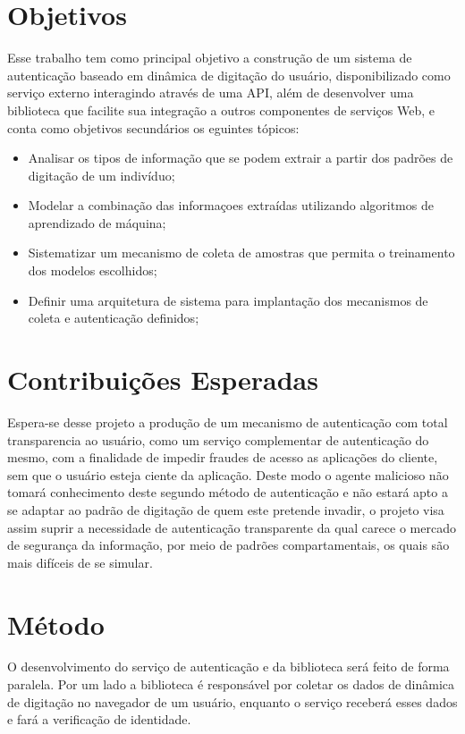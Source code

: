 \documentclass[pfc]{imetex}
\begin{document}
\section{Objetivos}
Esse trabalho tem como principal objetivo a construção de um sistema de autenticação baseado em dinâmica de digitação do usuário, disponibilizado como serviço externo interagindo através de uma API, além de desenvolver uma biblioteca que facilite sua integração a outros componentes de serviços Web, e conta como objetivos secundários os eguintes tópicos:

\begin{itemize}
\item Analisar os tipos de informação que se podem extrair a partir dos padrões de digitação de um indivíduo;
\item Modelar a combinação das informaçoes extraídas utilizando algoritmos de aprendizado de máquina;
\item Sistematizar um mecanismo de coleta de amostras que permita o treinamento dos modelos escolhidos;
\item Definir uma arquitetura de sistema para implantação dos mecanismos de coleta e autenticação definidos;
\end{itemize}

\section{Contribuições Esperadas}
Espera-se desse projeto a produção de um mecanismo de autenticação com total transparencia ao usuário, como um serviço complementar de autenticação do mesmo, com a finalidade de impedir fraudes de acesso as aplicações do cliente, sem que o usuário esteja ciente da aplicação. Deste modo o agente malicioso não tomará conhecimento deste segundo método de autenticação e não estará apto a se adaptar ao padrão de digitação de quem este pretende invadir, o projeto visa assim suprir a necessidade de autenticação transparente da qual carece o mercado de segurança da informação, por meio de padrões compartamentais, os quais são mais difíceis de se simular.  

\section{Método}
O desenvolvimento do serviço de autenticação e da biblioteca será feito de forma paralela. Por um lado a biblioteca é responsável por coletar os dados de dinâmica de digitação no navegador de um usuário, enquanto o serviço receberá esses dados e fará a verificação de identidade.
\end{document}
